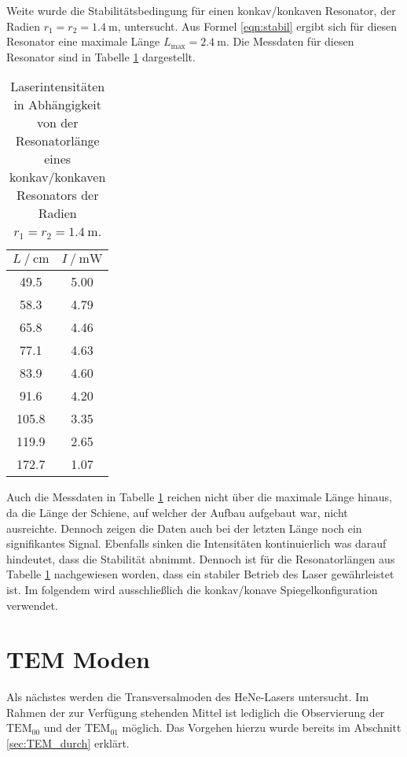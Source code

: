 Weite wurde die Stabilitätsbedingung für einen konkav/konkaven Resonator, der Radien $r_1 = r_2 = \qty{1.4}{\metre}$, untersucht. Aus Formel \ref{eqn:stabil} ergibt sich für diesen 
Resonator eine maximale Länge $L_\text{max} = \qty{2.4}{\metre}$. Die Messdaten für diesen Resonator sind in Tabelle \ref{tab:stabil_konkav} dargestellt. 

\begin{table}
    \centering

    \begin{tabular}{c c}
        \toprule
        {$ L \mathbin{/} \unit{\centi\metre}$} & {$I \mathbin{/} \unit{\milli\watt}$}\\
        \midrule
        49.5  & 5.00 \\
        58.3  & 4.79 \\
        65.8  & 4.46 \\
        77.1  & 4.63 \\
        83.9  & 4.60 \\
        91.6  & 4.20 \\
        105.8 & 3.35 \\
        119.9 & 2.65 \\
        172.7 & 1.07 \\
        \bottomrule
    \end{tabular}
    \caption{Laserintensitäten in Abhängigkeit von der Resonatorlänge eines konkav/konkaven Resonators der Radien $r_1 = r_2 = \qty{1.4}{\metre}$.}
    \label{tab:stabil_konkav}
\end{table}

Auch die Messdaten in Tabelle \ref{tab:stabil_konkav} reichen nicht über die maximale Länge hinaus, da die Länge der Schiene, auf welcher der Aufbau aufgebaut war, nicht ausreichte.
Dennoch zeigen die Daten auch bei der letzten Länge noch ein signifikantes Signal. Ebenfalls sinken die Intensitäten kontinuierlich was darauf hindeutet, dass die Stabilität abnimmt.
Dennoch ist für die Resonatorlängen aus Tabelle \ref{tab:stabil_konkav} nachgewiesen worden, dass ein stabiler Betrieb des Laser gewährleistet ist. Im folgendem wird ausschließlich die
konkav/konave Spiegelkonfiguration verwendet.

\section{TEM Moden}
\label{sec:TEM}
Als nächstes werden die Transversalmoden des HeNe-Lasers untersucht. Im Rahmen der zur Verfügung stehenden Mittel ist lediglich die Observierung der $\text{TEM}_{00}$ und der 
$\text{TEM}_{01}$ möglich. Das Vorgehen hierzu wurde bereits im Abschnitt \ref{sec:TEM_durch} erklärt. 

